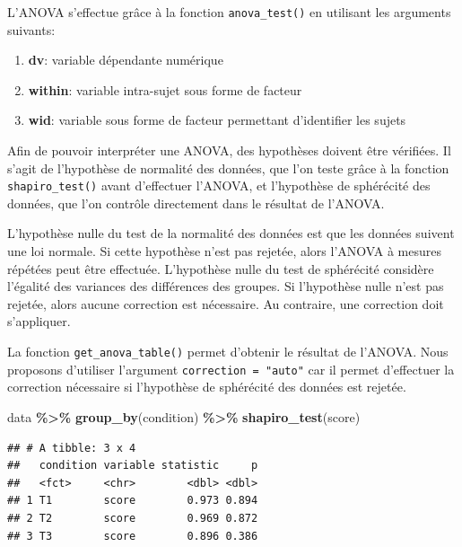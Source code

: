 \documentclass[
]{book}
\newenvironment{Shaded}{\begin{snugshade}}{\end{snugshade}}
\newcommand{\FunctionTok}[1]{\textcolor[rgb]{0.13,0.29,0.53}{\textbf{#1}}}
\newcommand{\NormalTok}[1]{#1}
\newcommand{\SpecialCharTok}[1]{\textcolor[rgb]{0.81,0.36,0.00}{\textbf{#1}}}
\providecommand{\tightlist}{%
  \setlength{\itemsep}{0pt}\setlength{\parskip}{0pt}}
\begin{document}
L'ANOVA s'effectue grâce à la fonction \texttt{anova\_test()} en utilisant les arguments suivants:

\begin{enumerate}
\def\labelenumi{\arabic{enumi}.}
\tightlist
\item
  \textbf{dv}: variable dépendante numérique
\item
  \textbf{within}: variable intra-sujet sous forme de facteur
\item
  \textbf{wid}: variable sous forme de facteur permettant d'identifier les sujets
\end{enumerate}

Afin de pouvoir interpréter une ANOVA, des hypothèses doivent être vérifiées. Il s'agit de l'hypothèse de normalité des données, que l'on teste grâce à la fonction \texttt{shapiro\_test()} avant d'effectuer l'ANOVA, et l'hypothèse de sphérécité des données, que l'on contrôle directement dans le résultat de l'ANOVA.

L'hypothèse nulle du test de la normalité des données est que les données suivent une loi normale. Si cette hypothèse n'est pas rejetée, alors l'ANOVA à mesures répétées peut être effectuée. L'hypothèse nulle du test de sphérécité considère l'égalité des variances des différences des groupes. Si l'hypothèse nulle n'est pas rejetée, alors aucune correction est nécessaire. Au contraire, une correction doit s'appliquer.

La fonction \texttt{get\_anova\_table()} permet d'obtenir le résultat de l'ANOVA. Nous proposons d'utiliser l'argument \texttt{correction\ =\ "auto"} car il permet d'effectuer la correction nécessaire si l'hypothèse de sphérécité des données est rejetée.

\begin{Shaded}
\begin{Highlighting}[]
\NormalTok{data }\SpecialCharTok{\%\textgreater{}\%}
  \FunctionTok{group\_by}\NormalTok{(condition) }\SpecialCharTok{\%\textgreater{}\%}
  \FunctionTok{shapiro\_test}\NormalTok{(score)}
\end{Highlighting}
\end{Shaded}

\begin{verbatim}
## # A tibble: 3 x 4
##   condition variable statistic     p
##   <fct>     <chr>        <dbl> <dbl>
## 1 T1        score        0.973 0.894
## 2 T2        score        0.969 0.872
## 3 T3        score        0.896 0.386
\end{verbatim}
\end{document}
